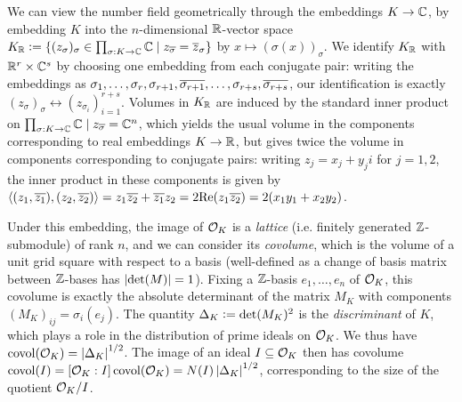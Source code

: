 \documentclass[11pt]{report}
\begin{document}
We can view the number field geometrically through the embeddings $K \to \mathbb{C}$, by embedding $K$ into the $n$-dimensional $\mathbb{R}$-vector space $K_{\mathbb{R}} \vcentcolon= \left\{  (z_\sigma)_{\sigma} \in \prod_{\sigma : K \to \mathbb{C}}\mathbb{C} \mid z_{\overline{\sigma}} = \overline{z}_\sigma  \right\}$ by $x \mapsto (\sigma(x))_{\sigma}$. We identify $K_{\mathbb{R}}$ with $\mathbb{R}^r \times \mathbb{C}^s$ by choosing one embedding from each conjugate pair: writing the embeddings as $\sigma_1, \ldots, \sigma_r, \sigma_{r + 1}, \overline{\sigma_{r + 1}}, \ldots, \sigma_{r + s}, \overline{\sigma_{r + s}}$, our identification is exactly $(z_\sigma)_\sigma \leftrightarrow (z_{\sigma_i})_{i = 1}^{r + s}$. Volumes in $K_{\mathbb{R}}$ are induced by the standard inner product on $\prod_{\sigma : K \to \mathbb{C}}\mathbb{C} \mid z_{\overline{\sigma}} = \mathbb{C}^n$, which yields the usual volume in the components corresponding to real embeddings $K \to \mathbb{R}$, but gives twice the volume in components corresponding to conjugate pairs: writing $z_j = x_j + y_ji$ for $j = 1, 2$, the inner product in these components is given by $\left\langle (z_1, \overline{z_1}), (z_2, \overline{z_2}) \right\rangle = z_1\overline{z_2} + \overline{z_1}z_2 = 2\text{Re}(z_1\overline{z_2}) = 2(x_1y_1 + x_2y_2)$.


Under this embedding, the image of $\mathcal{O}_K$ is a \emph{lattice} (i.e. finitely generated $\mathbb{Z}$-submodule) of rank $n$, and we can consider its \emph{covolume}, which is the volume of a unit grid square with respect to a basis (well-defined as a change of basis matrix between $\mathbb{Z}$-bases has $\left| \det(M) \right| = 1$). Fixing a $\mathbb{Z}$-basis $e_1, \ldots, e_n$ of $\mathcal{O}_K$, this covolume is exactly the absolute determinant of the matrix $M_K$ with components $(M_K)_{ij} = \sigma_i(e_j)$. The quantity $\Delta_K \vcentcolon= \det(M_K)^2$ is the \emph{discriminant} of $K$, which plays a role in the distribution of prime ideals on $\mathcal{O}_K$. We thus have $\operatorname{covol}(\mathcal{O}_K) = \left| \Delta_K \right|^{1/2}$. The image of an ideal $I \subseteq \mathcal{O}_K$ then has covolume $\operatorname{covol}(I) = [\mathcal{O}_K : I]\operatorname{covol}(\mathcal{O}_K) = N(I)\left| \Delta_K \right|^{1/2}$, corresponding to the size of the quotient $\mathcal{O}_K / I$.

\end{document}
